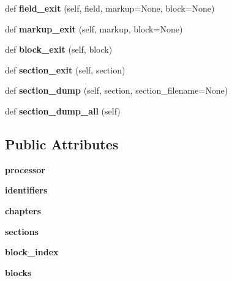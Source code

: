 \begin{DoxyCompactItemize}
def {\bfseries field\+\_\+exit} (self, field, markup=None, block=None)
\item 
\mbox{\label{classformatter_1_1_formatter_a49b329e9fa4cb4bcd1faca179d4128b1}} 
def {\bfseries markup\+\_\+exit} (self, markup, block=None)
\item 
\mbox{\label{classformatter_1_1_formatter_a19154a0673544d248f4a5bfd75d1898e}} 
def {\bfseries block\+\_\+exit} (self, block)
\item 
\mbox{\label{classformatter_1_1_formatter_a933962d38ca3f2833b81a7efddf38b0b}} 
def {\bfseries section\+\_\+exit} (self, section)
\item 
\mbox{\label{classformatter_1_1_formatter_af4f9260c0b72d776309dbec7d6757c3f}} 
def {\bfseries section\+\_\+dump} (self, section, section\+\_\+filename=None)
\item 
\mbox{\label{classformatter_1_1_formatter_a57f88f223b63dc34b927b84f6253e00d}} 
def {\bfseries section\+\_\+dump\+\_\+all} (self)
\end{DoxyCompactItemize}
\subsection*{Public Attributes}
\begin{DoxyCompactItemize}
\item 
\mbox{\label{classformatter_1_1_formatter_ae2749d08d9132dc7cd34427379a5d509}} 
{\bfseries processor}
\item 
\mbox{\label{classformatter_1_1_formatter_aed1ece16482952bf9ed882d1a97597dc}} 
{\bfseries identifiers}
\item 
\mbox{\label{classformatter_1_1_formatter_aa79ca0dbd39ba6cf5ce4e787e95d07f9}} 
{\bfseries chapters}
\item 
\mbox{\label{classformatter_1_1_formatter_ad60df56db8782706517cfa7ec2258a49}} 
{\bfseries sections}
\item 
\mbox{\label{classformatter_1_1_formatter_ae5b78f7e0c14c6213214213b8d16bce1}} 
{\bfseries block\+\_\+index}
\item 
\mbox{\label{classformatter_1_1_formatter_a5a81eeb6edbdce38cc24a725af352606}} 
{\bfseries blocks}
\end{DoxyCompactItemize}


